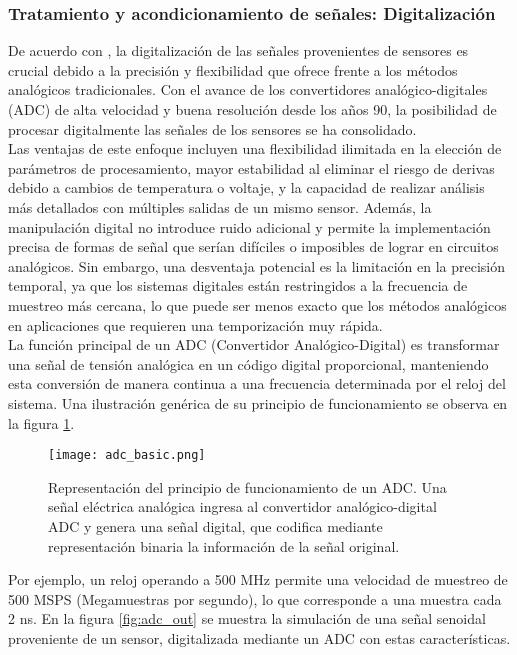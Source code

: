 \documentclass{report}
\begin{document}
\subsubsection{Tratamiento y acondicionamiento de señales: Digitalización}
\noindent De acuerdo con \cite{meyer2007digital}, la digitalización de las señales provenientes de sensores es crucial debido a la precisión y flexibilidad que ofrece frente a los métodos analógicos tradicionales. Con el avance de los convertidores analógico-digitales (ADC) de alta velocidad y buena resolución desde los años 90, la posibilidad de procesar digitalmente las señales de los sensores se ha consolidado.\\

\noindent Las ventajas de este enfoque incluyen una flexibilidad ilimitada en la elección de parámetros de procesamiento, mayor estabilidad al eliminar el riesgo de derivas debido a cambios de temperatura o voltaje, y la capacidad de realizar análisis más detallados con múltiples salidas de un mismo sensor. Además, la manipulación digital no introduce ruido adicional y permite la implementación precisa de formas de señal que serían difíciles o imposibles de lograr en circuitos analógicos. Sin embargo, una desventaja potencial es la limitación en la precisión temporal, ya que los sistemas digitales están restringidos a la frecuencia de muestreo más cercana, lo que puede ser menos exacto que los métodos analógicos en aplicaciones que requieren una temporización muy rápida.\\

\noindent La función principal de un ADC (Convertidor Analógico-Digital) es transformar una señal de tensión analógica en un código digital proporcional, manteniendo esta conversión de manera continua a una frecuencia determinada por el reloj del sistema. Una ilustración genérica de su principio de funcionamiento se observa en la figura \ref{fig:adc_basic}. 

\begin{figure}[h]
    \centering
    \texttt{[image: adc\_basic.png]}
    \caption{Representación del principio de funcionamiento de un ADC. Una señal eléctrica analógica ingresa al convertidor analógico-digital ADC y genera una señal digital, que codifica mediante representación binaria la información de la señal original.}
    \label{fig:adc_basic}
\end{figure}

\noindent Por ejemplo, un reloj operando a 500 MHz permite una velocidad de muestreo de 500 MSPS (Megamuestras por segundo), lo que corresponde a una muestra cada 2 ns. En la figura \ref{fig:adc_out} se muestra la simulación de una señal senoidal proveniente de un sensor, digitalizada mediante un ADC con estas características.
\end{document}
